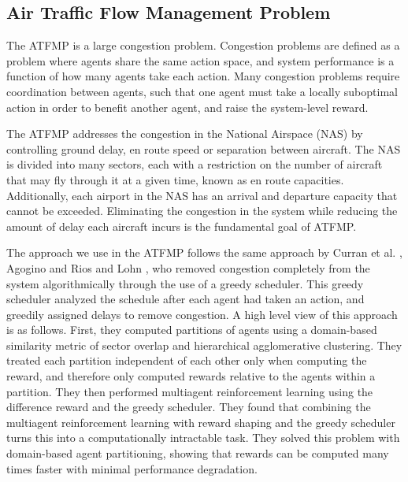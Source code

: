 \documentclass[letterpaper]{article}
\begin{document}
\subsection{Air Traffic Flow Management Problem}

The ATFMP is a large congestion problem. Congestion problems are defined as a problem where agents share the same action space, and system performance is a function of how many agents take each action. Many congestion problems require coordination between agents, such that one agent must take a locally suboptimal action in order to benefit another agent, and raise the system-level reward.

The ATFMP addresses the congestion in the National Airspace (NAS) by controlling ground delay, en route speed or separation between aircraft. The NAS is divided into many sectors, each with a restriction on the number of aircraft that may fly through it at a given time, known as en route capacities. Additionally, each airport in the NAS has an arrival and departure capacity that cannot be exceeded. Eliminating the congestion in the system while reducing the amount of delay each aircraft incurs is the fundamental goal of ATFMP. 

The approach we use in the ATFMP follows the same approach by Curran et al. , Agogino  and Rios and Lohn , who removed congestion completely from the system algorithmically through the use of a greedy scheduler. This greedy scheduler analyzed the schedule after each agent had taken an action, and greedily assigned delays to remove congestion. A high level view of this approach is as follows. First, they computed partitions of agents using a domain-based similarity metric of sector overlap and hierarchical agglomerative clustering. They treated each partition independent of each other only when computing the reward, and therefore only computed rewards relative to the agents within a partition. They then performed multiagent reinforcement learning using the difference reward and the greedy scheduler. They found that combining the multiagent reinforcement learning with reward shaping and the greedy scheduler turns this into a computationally intractable task. They solved this problem with domain-based agent partitioning, showing that rewards can be computed many times faster with minimal performance degradation.
\end{document}
